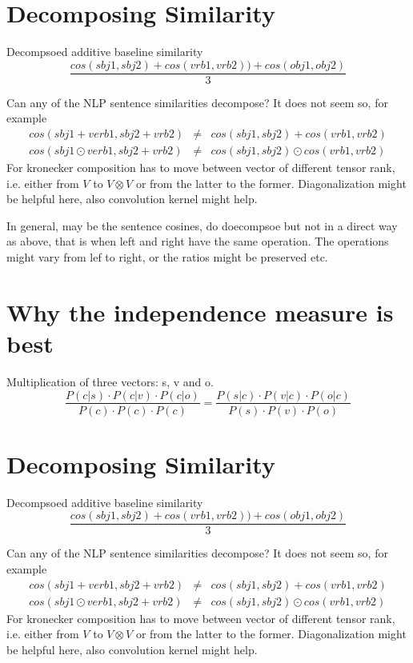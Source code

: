 \section{Decomposing Similarity}
Decompsoed additive baseline similarity
\[
\frac{cos(sbj1,sbj2) + cos(vrb1,vrb2)) + cos(obj1,obj2)}{3}
\]

Can any of the NLP sentence similarities decompose? It does not seem so, for example
\begin{eqnarray*}
cos(sbj1+verb1,sbj2+vrb2) &\neq& cos(sbj1, sbj2) + cos(vrb1,vrb2) \\
cos(sbj1\odot verb1,sbj2+vrb2) &\neq& cos(sbj1, sbj2) \odot cos(vrb1,vrb2)
\end{eqnarray*}
For kronecker composition has to move between vector of different tensor rank, i.e. either from $V$ to $V \otimes V$ or from the latter to the former. Diagonalization might be helpful here, also convolution kernel might help. 

In general, may be the sentence cosines, do doecompsoe but not in a direct way as above, that is when left and right have the same operation. The operations might vary from lef to right, or the ratios might be preserved etc.


\section{Why the independence measure is best}

Multiplication of three vectors: s, v and o.
\[
\frac{
P(c|s) \cdot P(c|v) \cdot P(c|o)}{
P(c) \cdot P(c) \cdot P(c)} =
\frac{
P(s|c) \cdot P(v|c) \cdot P(o|c)
}{
P(s) \cdot P(v) \cdot P(o)
}
\]



\section{Decomposing Similarity}
Decompsoed additive baseline similarity
\[
\frac{cos(sbj1,sbj2) + cos(vrb1,vrb2)) + cos(obj1,obj2)}{3}
\]

Can any of the NLP sentence similarities decompose? It does not seem so, for example
\begin{eqnarray*}
cos(sbj1+verb1,sbj2+vrb2) &\neq& cos(sbj1, sbj2) + cos(vrb1,vrb2) \\
cos(sbj1\odot verb1,sbj2+vrb2) &\neq& cos(sbj1, sbj2) \odot cos(vrb1,vrb2)
\end{eqnarray*}
For kronecker composition has to move between vector of different tensor rank, i.e. either from $V$ to $V \otimes V$ or from the latter to the former. Diagonalization might be helpful here, also convolution kernel might help. 

